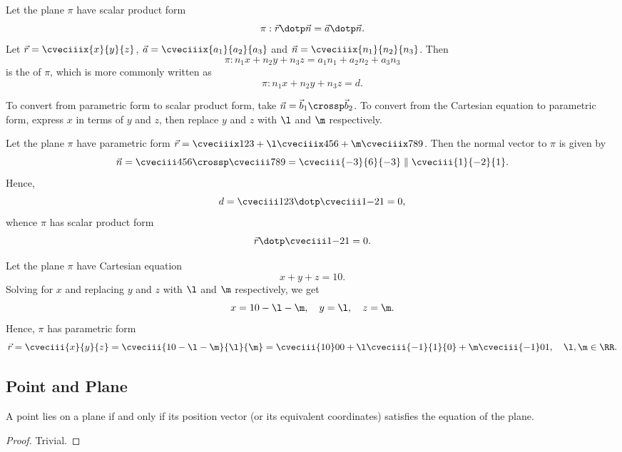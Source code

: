 \begin{definition}
    Let the plane $\pi$ have scalar product form \[\pi : \vec r \dotp \vec n = \vec a \dotp \vec n.\] Let $\vec r = \cveciiix{x}{y}{z}$, $\vec a = \cveciiix{a_1}{a_2}{a_3}$ and $\vec n = \cveciiix{n_1}{n_2}{n_3}$. Then \[\pi : n_1 x + n_2 y + n_3 z = a_1 n_1 + a_2 n_2 + a_3 n_3\] is the  of $\pi$, which is more commonly written as \[\pi : n_1 x + n_2 y + n_3 z = d.\]
\end{definition}

\begin{method}
    To convert from parametric form to scalar product form, take $\vec n = \vec b_1 \crossp \vec b_2$. To convert from the Cartesian equation to parametric form, express $x$ in terms of $y$ and $z$, then replace $y$ and $z$ with $\l$ and $\m$ respectively.
\end{method}

\begin{example}
    Let the plane $\pi$ have parametric form $\vec r = \cveciiix123 + \l \cveciiix456 + \m \cveciiix789$. Then the normal vector to $\pi$ is given by \[\vec n = \cveciii456 \crossp \cveciii789 = \cveciii{-3}{6}{-3} \parallel \cveciii{1}{-2}{1}.\] Hence, \[d = \cveciii123 \dotp \cveciii1{-2}1 = 0,\] whence $\pi$ has scalar product form \[\vec r \dotp \cveciii1{-2}1 = 0.\]
\end{example}

\begin{example}
    Let the plane $\pi$ have Cartesian equation \[x + y + z = 10.\] Solving for $x$ and replacing $y$ and $z$ with $\l$ and $\m$ respectively, we get \[x = 10 - \l - \m, \quad y = \l, \quad z = \m.\] Hence, $\pi$ has parametric form \[\vec r = \cveciii{x}{y}{z} = \cveciii{10 - \l - \m}{\l}{\m} = \cveciii{10}00 + \l \cveciii{-1}{1}{0} + \m \cveciii{-1}0{1}, \quad \l, \m \in \RR.\]
\end{example}

\subsection{Point and Plane}

\begin{proposition}
    A point lies on a plane if and only if its position vector (or its equivalent coordinates) satisfies the equation of the plane.
\end{proposition}
\begin{proof}
    Trivial.
\end{proof}


